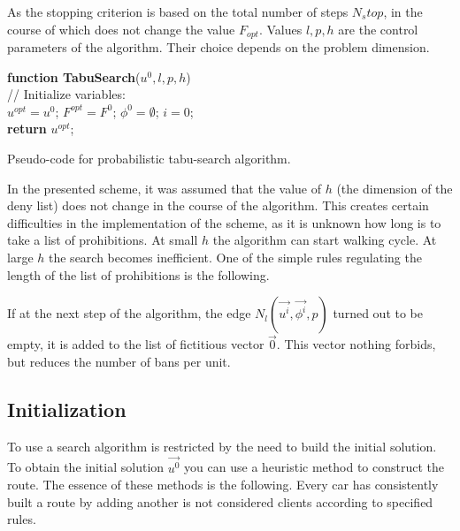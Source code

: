 \documentclass[]{TAACpaper}
\begin{document}
As the stopping criterion is based on the total number of steps $N_stop$, in the course of which does not change the value $F_{opt}$. Values $l,p,h$ are the control parameters of the algorithm. Their choice depends on the problem dimension.

\begin{algorithm}[H]
	\textbf{function TabuSearch}($u^0,l,p,h$) \\
	// Initialize variables:	\\
	$u^{opt} = u^0$;
	$F^{opt} = F^0$;
	$\phi^{0} =  \emptyset$;
	$i=0$; \\
	\textbf{return} $u^{opt}$;
	
\caption{Pseudo-code for probabilistic tabu-search algorithm.}
\label{alg:TabuSearch}
\end{algorithm}

In the presented scheme, it was assumed that the value of $h$ (the dimension of the deny list) does not change in the course of the algorithm. This creates certain difficulties in the implementation of the scheme, as it is unknown how long is to take a list of prohibitions. At small $h$ the algorithm can start walking cycle. At large $h$ the search becomes inefficient. One of the simple rules regulating the length of the list of prohibitions is the following.

If at the next step of the algorithm, the edge  $N_l(\vec{u^i},\vec{\phi^i},p)$ turned out to be empty, it is added to the list of fictitious vector $\vec{0}$. This vector nothing forbids, but reduces the number of bans per unit.

\subsection{Initialization}
To use a search algorithm is restricted by the need to build the initial solution. To obtain the initial solution $\vec{u^0}$ you can use a heuristic method to construct the route. The essence of these methods is the following. Every car has consistently built a route by adding another is not considered clients according to specified rules.
\end{document}
